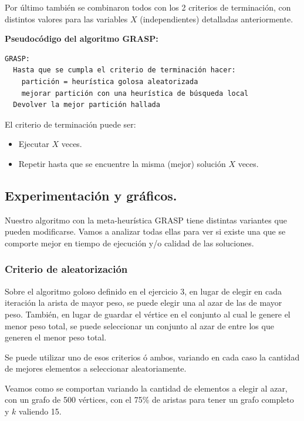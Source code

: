 Por último también se combinaron todos con los 2 criterios de terminación, con distintos valores para las variables $X$ (independientes) detalladas anteriormente.

\vspace*{0.75cm}

\textbf{Pseudocódigo del algoritmo GRASP:}

\vspace*{0.1cm}

\begin{verbatim}
GRASP:
  Hasta que se cumpla el criterio de terminación hacer:
    partición = heurística golosa aleatorizada
    mejorar partición con una heurística de búsqueda local
  Devolver la mejor partición hallada
\end{verbatim}

El criterio de terminación puede ser:
\begin{itemize}
  \item Ejecutar $X$ veces.
  \item Repetir hasta que se encuentre la misma (mejor) solución $X$ veces.
\end{itemize}

\newpage
\subsection{Experimentación y gráficos.}
\vspace*{0.3cm}

Nuestro algoritmo con la meta-heurística GRASP tiene distintas variantes que
pueden modificarse. Vamos a analizar todas ellas para ver si existe una que
se comporte mejor en tiempo de ejecución y/o calidad de las soluciones.

\subsubsection{Criterio de aleatorización}

Sobre el algoritmo goloso definido en el ejercicio 3, en lugar de elegir en cada iteración la arista de mayor peso, se puede elegir una al azar de las de mayor peso. También, en lugar de guardar el vértice en el conjunto al cual le genere el menor peso total, se puede seleccionar un conjunto al azar de entre los que generen el menor peso total.

Se puede utilizar uno de esos criterios ó ambos, variando en cada
caso la cantidad de mejores elementos a seleccionar aleatoriamente.

Veamos como se comportan variando la cantidad de elementos a elegir al azar,
con un grafo de 500 vértices, con el 75\% de aristas para tener un grafo
completo y $k$ valiendo 15.
\vspace*{0.5cm}

